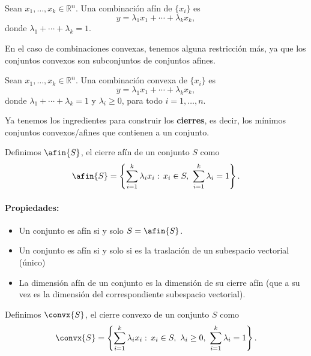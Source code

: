 \begin{defn}

Sean $x_1,\ldots,x_k \in\mathbb{R}^n$. Una combinación afín de $\{x_i\}$ es
\[
y = \lambda_1 x_1+\cdots +\lambda_k x_k,
\]
donde $\lambda_1+\cdots +\lambda_k=1$.
\end{defn}


En el caso de combinaciones convexas, tenemos alguna restricción más, ya que los conjuntos convexos son subconjuntos de conjuntos afines.

\begin{defn} 
Sean $x_1,\ldots,x_k \in\mathbb{R}^n$. Una combinación convexa de $\{x_i\}$ es
\[
y = \lambda_1 x_1+\cdots +\lambda_k x_k,
\]
donde $\lambda_1+\cdots +\lambda_k=1$ y $\lambda_i \geq 0$, para todo $i=1,\ldots,n$.
\end{defn}


Ya tenemos los ingredientes para construir los \textbf{cierres}, es decir, los mínimos conjuntos convexos/afines que contienen a un conjunto.


\begin{defn} 
Definimos $\afin{S}$, el cierre afín de un conjunto $S$ como
\[
\afin{S} = \left\{\sum_{i=1}^k \lambda_i x_i:\, x_i\in S,\  \sum_{i=1}^k \lambda_i = 1\right\}.
\]
\end{defn}

\paragraph{Propiedades:}
\begin{itemize}
\item Un conjunto es afín si y solo $S=\afin{S}$.

\item Un conjunto es afín si y solo si es la traslación de un subespacio vectorial (único)

\item La dimensión afín de un conjunto es la dimensión de su cierre afín (que a su vez es la dimensión del correspondiente subespacio vectorial).
\end{itemize}




\begin{defn}
Definimos $\convx{S}$, el cierre convexo de un conjunto $S$ como
\[
\convx{S} = \left\{\sum_{i=1}^k \lambda_i x_i:\, x_i\in S,\ \lambda_i\geq 0,\ \sum_{i=1}^k \lambda_i = 1\right\}.
\]
\end{defn}

